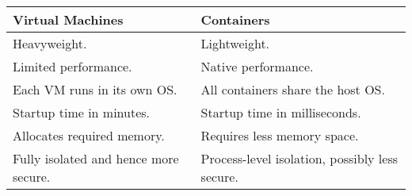 \begin{table}[]
    \begin{tabular}{|l|l|}
    \hline
    \textbf{Virtual Machines}             & \textbf{Containers}                            \\ \hline
    Heavyweight.                          & Lightweight.                                   \\
    Limited performance.                  & Native performance.                            \\
    Each VM runs in its own OS.           & All containers share the host OS.              \\
    Startup time in minutes.              & Startup time in milliseconds.                  \\
    Allocates required memory.            & Requires less memory space.                    \\
    Fully isolated and hence more secure. & Process-level isolation, possibly less secure. \\ \hline
    \end{tabular}
\end{table}